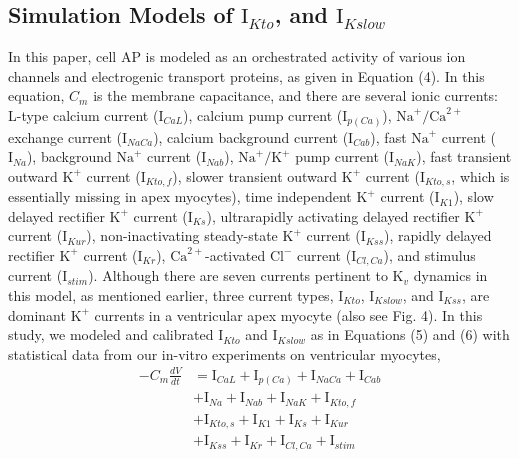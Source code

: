 \documentclass[journal]{IEEEtran}
\begin{document}
\subsection{Simulation Models of $\text{I}_{Kto}$, and $\text{I}_{Kslow}$}
In this paper, cell AP is modeled as an orchestrated activity of various ion channels and electrogenic transport proteins, as given in Equation (4). In this equation, $C_m$ is the membrane capacitance, and there are several ionic currents: L-type calcium current ($\text{I}_{CaL}$), calcium pump current ($\text{I}_{p(Ca)}$), $\text{Na}^{+}/\text{Ca}^{2+}$ exchange current ($\text{I}_{NaCa}$), calcium background current ($\text{I}_{Cab}$), fast $\text{Na}^{+}$ current ($\text{I}_{Na}$), background $\text{Na}^{+}$ current ($\text{I}_{Nab}$), $\text{Na}^{+}/\text{K}^{+}$ pump current ($\text{I}_{NaK}$), fast transient outward $\text{K}^{+}$ current ($\text{I}_{Kto,f}$), slower transient outward $\text{K}^{+}$ current ($\text{I}_{Kto,s}$, which is essentially missing in apex myocytes), time independent $\text{K}^{+}$ current ($\text{I}_{K1}$), slow delayed rectifier $\text{K}^{+}$ current ($\text{I}_{Ks}$), ultrarapidly activating delayed rectifier $\text{K}^{+}$ current ($\text{I}_{Kur}$), non-inactivating steady-state $\text{K}^{+}$ current ($\text{I}_{Kss}$), rapidly delayed rectifier $\text{K}^{+}$ current ($\text{I}_{Kr}$), $\text{Ca}^{2+}$-activated $\text{Cl}^{-}$ current ($\text{I}_{Cl,Ca}$), and stimulus current ($\text{I}_{stim}$). Although there are seven currents pertinent to $\text{K}_{v}$ dynamics in this model, as mentioned earlier, three current types, $\text{I}_{Kto}$, $\text{I}_{Kslow}$, and $\text{I}_{Kss}$, are dominant $\text{K}^{+}$ currents in a ventricular apex myocyte \cite{nerbonne2005molecular} (also see Fig. 4). In this study, we modeled and calibrated $\text{I}_{Kto}$ and $\text{I}_{Kslow}$ as in Equations (5) and (6) with statistical data from our in-vitro experiments on ventricular myocytes,
\begin{equation}
\begin{split}
    -C_{m}\frac{dV}{dt} &= \text{I}_{CaL}+\text{I}_{p(Ca)}+\text{I}_{NaCa}+\text{I}_{Cab}\\
    &+\text{I}_{Na}+\text{I}_{Nab}+\text{I}_{NaK}+\text{I}_{Kto,f}\\
    &+\text{I}_{Kto,s}+\text{I}_{K1}+\text{I}_{Ks}+\text{I}_{Kur}\\
    &+\text{I}_{Kss}+\text{I}_{Kr}+\text{I}_{Cl,Ca}+\text{I}_{stim}
\end{split}
\end{equation}
\end{document}
